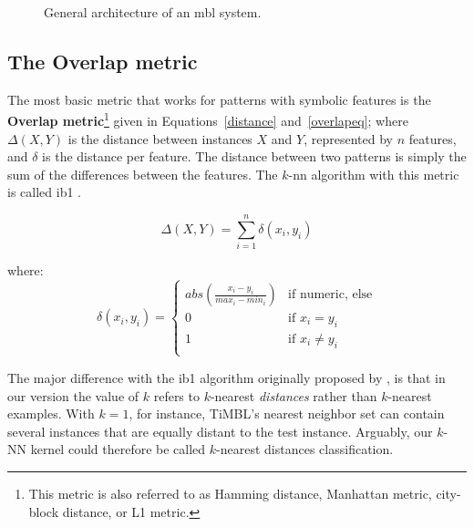 \documentclass{report}
\begin{document}
\begin{figure}[htb]
        \begin{center}
                \leavevmode
                \epsfxsize=8cm
                \caption{General architecture of an {\sc mbl} system.
                }
                \label{mbl-method}
        \end{center}
\end{figure}

\subsection{The Overlap metric}
\label{overlap}

The most basic metric that works for patterns with symbolic features
is the {\bf Overlap metric}\footnote{This metric is also referred to
as Hamming distance, Manhattan metric, city-block distance, or L1
metric.} given in Equations~\ref{distance} and~\ref{overlapeq}; where
$\Delta(X,Y)$ is the distance between instances $X$ and $Y$,
represented by $n$ features, and $\delta$ is the distance per
feature. The distance between two patterns is simply the sum of the
differences between the features. The $k$-{\sc nn} algorithm with this
metric is called {\sc ib1} \cite{Aha+91}. 

\begin{equation}
\Delta(X,Y) = \sum_{i=1}^{n} \delta(x_{i},y_{i})
\label{distance}
\end{equation}

where:
\begin{equation}
\delta(x_{i}, y_{i}) = \left\{ \begin{array}{ll}
		abs(\frac{x_{i}-y_{i}}{max_{i}-min_{i}}) & \mbox{if numeric, else}\\
		0 & \mbox{if $x_{i} = y_{i}$}\\
		1 & \mbox{if $x_{i} \neq y_{i}$}\\
	\end{array} \right.
\label{overlapeq}
\end{equation}

The major difference with the {\sc ib1} algorithm originally proposed
by \cite{Aha+91}, is that in our version the value of $k$ refers to
$k$-nearest {\em distances}\/ rather than $k$-nearest examples. With
$k=1$, for instance, TiMBL's nearest neighbor set can contain several
instances that are equally distant to the test instance. Arguably, our
$k$-NN kernel could therefore be called $k$-nearest distances
classification.
\end{document}
